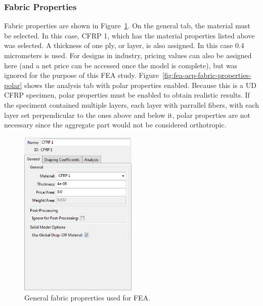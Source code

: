 \clearpage

\subsubsection{Fabric Properties}

\indent

Fabric properties are shown in Figure~\ref{fig:fea-acp-fabric-prorties-general}. On the general tab, the material must be selected. In this case, CFRP 1, which has the material properties listed above was selected. A thickness of one ply, or layer, is also assigned. In this case 0.4 micrometers is used. For designs in industry, pricing values can also be assigned here (and a net price can be accessed once the model is complete), but was ignored for the purpose of this FEA study. Figure~\ref{fig:fea-acp-fabric-properties-polar} shows the analysis tab with polar properties enabled. Because this is a UD CFRP specimen, polar properties must be enabled to obtain realistic results. If the speciment contained multiple layers, each layer with parrallel fibers, with each layer set perpendicular to the ones above and below it, polar properties are not necessary since the aggregate part would not be considered orthotropic.\\

\begin{figure}[htp]
\centering
\includegraphics[width=0.5\textwidth]{./figures/fea/fea-acp-fabric-prorties-general}
\caption{General fabric proprerties used for FEA.}
\label{fig:fea-acp-fabric-prorties-general}
\end{figure}

